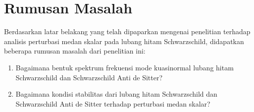 \section{Rumusan Masalah}

Berdasarkan latar belakang yang telah dipaparkan mengenai penelitian terhadap analisis perturbasi medan skalar pada lubang hitam Schwarzschild, didapatkan beberapa rumusan masalah dari penelitian ini:
\begin{enumerate}
    \item Bagaimana bentuk spektrum frekuensi mode kuasinormal lubang hitam Schwarzschild dan Schwarzschild Anti de Sitter?
    \item Bagaimana kondisi stabilitas dari lubang hitam Schwarzschild dan Schwarzschild Anti de Sitter terhadap perturbasi medan skalar?
\end{enumerate}